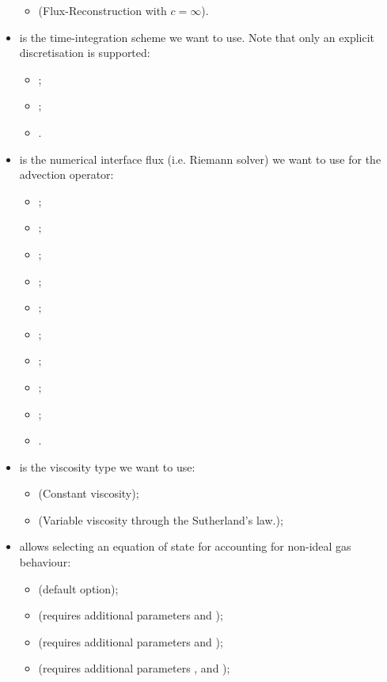 \begin{itemize}
\begin{itemize}
\item {} (Flux-Reconstruction with $c = \infty$).
\end{itemize}
\item {} is the time-integration scheme we want to use.
Note that only an explicit discretisation is supported:
\begin{itemize}
\item {};
\item {};
\item {}.
\end{itemize}
\item {} is the numerical interface flux (i.e. Riemann solver)
we want to use for the advection operator:
\begin{itemize}
\item {};
\item {};
\item {};
\item {};
\item {};
\item {};
\item {};
\item {};
\item {};
\item {}.
\end{itemize}
\item {} is the viscosity type we want to use:
\begin{itemize}
\item {} (Constant viscosity);
\item {} (Variable viscosity through the Sutherland's law.);
\end{itemize}
\item {} allows selecting an equation of state for
accounting for non-ideal gas behaviour:
\begin{itemize}
\item {} (default option);
\item {} (requires additional parameters  and );
\item {} (requires additional parameters  and );
\item {} (requires additional parameters ,  and
);
\end{itemize}
\end{itemize}

